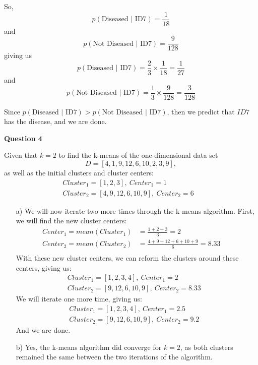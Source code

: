 \documentclass[12pt]{article} %
\begin{document}
\begin{flushleft}
So, \[p(\text{Diseased $|$ ID7}) = \frac{1}{18}\] and \[p(\text{Not Diseased $|$ ID7}) = \frac{9}{128}\] giving us \[p(\text{Diseased $|$ ID7}) = \frac{2}{3}\times\frac{1}{18} = \frac{1}{27}\]
and \[p(\text{Not Diseased $|$ ID7}) = \frac{1}{3}\times\frac{9}{128} = \frac{3}{128}\]

Since $p(\text{Diseased $|$ ID7}) > p(\text{Not Diseased $|$ ID7})$, then we predict that $ID7$ has the disease, and we are done.
\vspace{0.5cm}

\textbf{Question 4}


	Given that $k = 2$ to find the k-means of the one-dimensional data set \[D = [ 4, 1, 9, 12, 6, 10, 2, 3, 9 ],\] as well as the initial clusters and cluster centers:
\begin{align*}&Cluster_1 = [1,2,3],\ Center_1 = 1&&\\&Cluster_2 = [4, 9, 12, 6, 10, 9],\ Center_2 = 6\end{align*}
\begin{enumerate}
	\item[a)]
		We will now iterate two more times through the k-means algorithm. First, we will find the new cluster centers:
		\begin{align*}
			Center_1 = mean(Cluster_1) &= \frac{1+2+3}{3} = 2 &&\\
			Center_2 = mean(Cluster_2) &= \frac{4 + 9 + 12 + 6 + 10 + 9}{6} = 8.33 &&\\
		\end{align*}
		With these new cluster centers, we can reform the clusters around these centers, giving us:
		\begin{align*}&Cluster_1 = [1,2,3,4],\ Center_1 = 2&&\\&Cluster_2 = [9, 12, 6, 10, 9],\ Center_2 = 8.33\end{align*}
		We will iterate one more time, giving us:
		\begin{align*}&Cluster_1 = [1,2,3,4],\ Center_1 = 2.5&&\\&Cluster_2 = [9, 12, 6, 10, 9],\ Center_2 = 9.2\end{align*}
		And we are done.
	\item[b)]
		Yes, the k-means algorithm did converge for $k = 2$, as both clusters remained the same between the two iterations of the algorithm.
\end{enumerate}

\end{flushleft}
\end{document}
